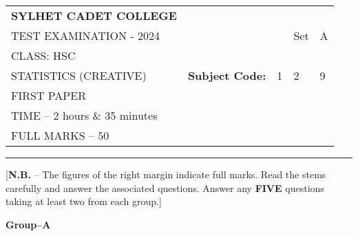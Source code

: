 \documentclass{article}
\begin{document}
\begin{table}[h]
\centering
\begin{tabular}{lllll}
\textbf{\large SYLHET CADET COLLEGE} &  &  &  &  \\ \cline{4-5} 
TEST EXAMINATION - 2024 &  & \multicolumn{1}{l|}{} & \multicolumn{1}{l|}{Set} & \multicolumn{1}{l|}{A} \\ \cline{4-5} 
CLASS: HSC &  &  &  &  \\ \cline{3-5} 
STATISTICS (CREATIVE)& \multicolumn{1}{l|}{\textbf{Subject Code:}} & \multicolumn{1}{l|}{1} & \multicolumn{1}{l|}{2} & \multicolumn{1}{l|}{9} \\ \cline{3-5} 
 FIRST PAPER &  &  &  &  \\
TIME – 2 hours \& 35 minutes &  &  &  &  \\
FULL MARKS – 50 &  &  &  & 
\end{tabular}
\end{table}

\hrule

\begin{center}
[\textbf{N.B.} – The figures of the right margin indicate full marks. Read the stems carefully and answer the associated questions. Answer any \textbf{FIVE} questions taking at least two from each group.]\\

\end{center}

  \begin{center}
  \textbf{Group--A}
  \end{center}
\end{document}
